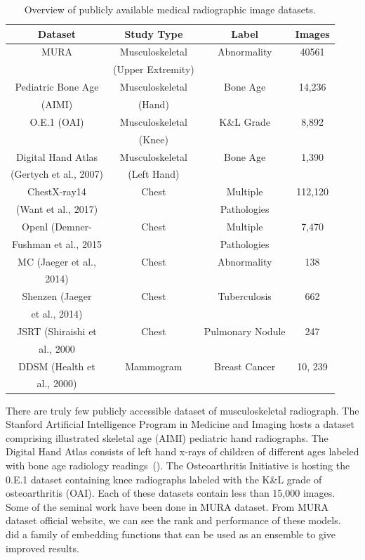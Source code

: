 \documentclass{article}
\begin{document}
\begin{table}[t]
    \centering
    \begin{tabular}{|c|c|c|c|}
    \hline
    \textbf{Dataset}&\textbf{Study Type}&\textbf{Label}&\textbf{Images}\\
    \hline
    MURA&Musculoskeletal&Abnormality&40561\\
    &(Upper Extremity)&&\\
    \hline
    Pediatric Bone Age&Musculoskeletal&Bone Age&14,236\\
    (AIMI)&(Hand)&&\\
    \hline
    O.E.1 (OAI)&Musculoskeletal& K\&L Grade&8,892\\
    &(Knee)&&\\
    \hline
    Digital Hand Atlas& Musculoskeletal&Bone Age&1,390\\
    (Gertych et al., 2007)& (Left Hand) &&\\
    \hline
    ChestX-ray14&Chest&Multiple&112,120\\
    (Want et al., 2017)&&Pathologies&\\
    \hline
    Openl (Demner-&Chest&Multiple&7,470\\
    Fushman et al., 2015&&Pathologies&\\
    \hline
    MC (Jaeger et al.,&Chest&Abnormality&138\\
    2014)&&&\\
    \hline
    Shenzen (Jaeger& Chest & Tuberculosis&662\\
    et al., 2014)&&&\\
    \hline
    JSRT (Shiraishi et&Chest& Pulmonary Nodule&247\\
    al., 2000&&&\\
    \hline
    DDSM (Health et&Mammogram&Breast Cancer&10, 239\\
    al., 2000)&&&\\
    \hline
    \end{tabular}
    \caption{Overview of publicly available medical radiographic image datasets.}
    \label{relatedwork}
\end{table}
There are truly few publicly accessible dataset of musculoskeletal radiograph. The Stanford Artificial Intelligence Program in Medicine and Imaging hosts a dataset comprising illustrated skeletal age (AIMI) pediatric hand radiographs. The Digital Hand Atlas consists of left hand x-rays of children of different ages labeled with bone age radiology readings~(\cite{gertych}). The Osteoarthritis Initiative is hosting the 0.E.1 dataset containing knee radiographs labeled with the K\&L grade of osteoarthritis (OAI). Each of these datasets contain less than 15,000 images.
Some of the seminal work have been done in MURA dataset. From MURA dataset official website, we can see the rank and performance of these models. ~\cite{xuan} did a family of embedding functions that can be used as an ensemble to give improved results.
\end{document}
